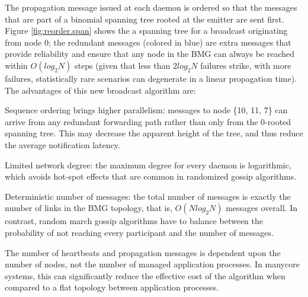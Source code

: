 \documentclass[5p,times,twocolumn]{elsarticle}
\begin{document}
The propagation message issued at each daemon is ordered so that the
messages that are part of a binomial spanning tree rooted at the emitter
are sent first. Figure \ref{fig:reorder.span} shows the a spanning tree
for a broadcast originating from node 0; the redundant messages (colored
in blue) are extra messages that provide reliability and ensure that
any node in the BMG can always be reached within $O(log_2 N)$ steps (given
that less than $2 log_2 N$ failures strike, with more failures,
statistically rare scenarios can degenerate in a linear propagation time).
The advantages of this new broadcast algorithm are:
\begin{compactenum}
  \item Sequence ordering brings higher parallelism: messages to node \{10, 11, 7\} can arrive from any redundant forwarding path rather than only from the 0-rooted spanning tree. This may decrease the apparent height of the tree, and thus reduce the average notification latency.
  \item Limited network degree: the maximum degree for every daemon is logarithmic, which avoids hot-spot effects that are common in randomized gossip algorithms.
  \item Deterministic number of messages: the total number of messages is
  exactly the number of links in the BMG topology, that is, $O(N log_2 N)$
  messages overall. In contrast, random march gossip algorithms have to
  balance between the probability of not reaching every participant and
  the number of messages.
  \item The number of heartbeats and propagation messages is dependent upon
  the number of nodes, not the number of managed application processes.
  In manycore systems, this can significantly reduce the
  effective cost of the algorithm when compared to a flat topology between
  application processes.
\end{compactenum}
\end{document}
